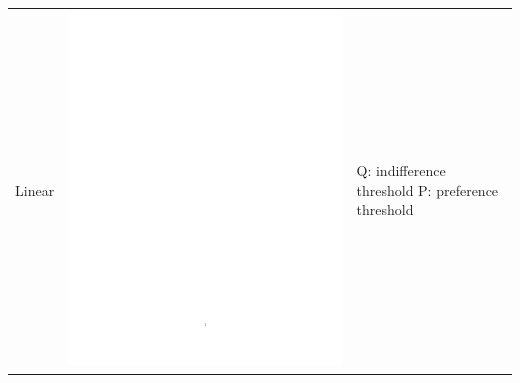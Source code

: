 \begin{enumerate}
\begin{table}[h!]
\begin{center}
\begin{tabular}{|l|c|b{4.2cm}|}
\hline Linear & \includegraphics[page=2,trim=7.5cm 14cm 5cm 7cm,clip,scale=0.4]{prom_linear_pdf} & Q: indifference threshold \newline P: preference threshold\\

\end{tabular}
\end{center}
\end{table}
\end{enumerate}
